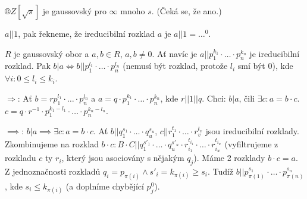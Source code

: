 \documentclass[12pt]{article}                   %
\begin{document}
        \begin{priklad}
            $®Z[\sqrt{s}]$ je gaussovský pro $∞$ mnoho $s$. (Čeká se, že ano.)
        \end{priklad}

        \begin{poznamka}
            $a||1$, pak řekneme, že ireducibilní rozklad $a$ je $a||1 = …^0$.
        \end{poznamka}

        \begin{tvrzeni}
            $R$ je gaussovský obor a $a, b \in R$, $a, b ≠ 0$. Ať navíc je $a || p_1^{k_1}·…·p_n^{k_n}$ je ireducibilní rozklad. Pak $b|a \Leftrightarrow b || p_1^{l_1}·…·p_n^{l_n}$ (nemusí být rozklad, protože $l_i$ smí být 0), kde $\forall i: 0≤l_i≤k_i$.

            \begin{dukazin}
                $\Rightarrow$: Ať $b = rp_1^{l_1}·…·p_n^{l_n}$ a $a = q·p_1^{k_1}·…·p_n^{k_n}$, kde $r || 1 || q$. Chci: $b|a$, čili $\exists c: a=b·c$. $c = q·r^{-1}·p_1^{k_1-l_1}·…·p_n^{k_n - l_n}$.

                $\implies$: $b|a \implies \exists c: a = b·c$. Ať $b||q_1^{s_1}·…·q_u^{s_u}$, $c || r_1^{t_1}·…·r_v^{t_v}$ jsou ireducibilní rozklady. Zkombinujeme na rozklad $b·c: B·C||q_1^{s'_1}·…·q_u^{s'_u}·r_{i_1}^{t_{i_1}}·…·r_{i_w}^{t_{i_w}}$ (vyfiltrujeme z rozkladu $c$ ty $r_i$, který jsou asociovány s nějakým $q_j$). Máme 2 rozklady $b·c = a$. Z jednoznačnosti rozkladů $q_i = p_{\pi(i)} \land s'_i = k_{\pi(i)} ≥ s_i$. Tudíž $b || p_{\pi(1)}^{s_1}·…·p_{\pi(n)}^{s_n}$, kde $s_i ≤ k_{\pi(i)}$ (a doplníme chybějící $p_j^0$).
            \end{dukazin}
        \end{tvrzeni}
\end{document}
